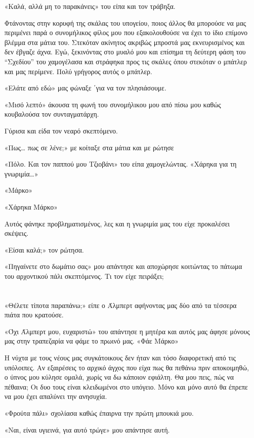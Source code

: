 \documentclass[12pt,twoside, openany]{book}
\begin{document}
«Καλά, αλλά μη το παρακάνεις» του είπα και τον τράβηξα.

Φτάνοντας στην κορυφή της σκάλας του υπογείου, ποιος άλλος θα μπορούσε να μας περιμένει παρά ο συνομήλικος φίλος μου που εξακολουθούσε να έχει το ίδιο επίμονο βλέμμα στα μάτια του. Στεκόταν ακίνητος ακριβώς μπροστά μας εκνευρισμένος και δεν έβγαζε άχνα. Εγώ, ξεκινόντας στο μυαλό μου και επίσημα τη δεύτερη φάση του “Σχεδίου” του χαμογέλασα και στράφηκα προς τις σκάλες όπου στεκόταν ο μπάτλερ και μας περίμενε. Πολύ γρήγορος αυτός ο μπάτλερ.

«Ελάτε από εδώ» μας φώναξε ΄για να τον πλησιάσουμε.

«Μισό λεπτό» άκουσα τη φωνή του συνομήλικου μου από πίσω μου καθώς κουβαλούσα τον συνταγματάρχη.

Γύρισα και είδα τον νεαρό σκεπτόμενο.

«Πως… πως σε λένε;» με κοίταξε στα μάτια και με ρώτησε

«Πόλο. Και τον παππού μου Τζιοβάνι» του είπα χαμογελώντας. «Χάρηκα για τη γνωριμία…»

«Μάρκο»

«Χάρηκα Μάρκο»

Αυτός φάνηκε προβληματισμένος, λες και η γνωριμία μας του είχε προκαλέσει σκέψεις.

«Είσαι καλά;» τον ρώτησα.

«Πηγαίνετε στο δωμάτιο σας» μου απάντησε και αποχώρησε κοιτώντας το πάτωμα του αρχοντικού πάλι σκεπτόμενος. Τι τον είχε πειράξει;


\chapter{}

«Θέλετε τίποτα παραπάνω;» είπε ο Άλμπερτ αφήνοντας μας δύο από τα τέσσερα πιάτα που κρατούσε.

«Όχι Άλμπερτ μου, ευχαριστώ» του απάντησε η μητέρα και αυτός μας άφησε μόνους μας στην τραπεζαρία να φάμε το πρωινό μας. «Φάε Μάρκο»

Η νύχτα με τους νέους μας συγκάτοικους δεν ήταν και τόσο διαφορετική από τις υπόλοιπες. Αν εξαιρέσεις το αρχικό άγχος που είχα πως θα πεθάνω πριν αποκοιμηθώ, ο ύπνος μου κύλησε ομαλά, χωρίς να δω κάποιον εφιάλτη. Θα μου πεις, πώς να πέθαινα; Οι δυο τους είναι κλειδωμένοι στο υπόγειο. Μόνο και μόνο αυτό θα έπρεπε να μου έχει απαλύνει την ανησυχία.

«Φρούτα πάλι» σχολίασα καθώς έπαιρνα την πρώτη μπουκιά μου.

«Ναι, είναι υγιεινά, για αυτό τρώγε» μου απάντησε αυτή.
\end{document}
